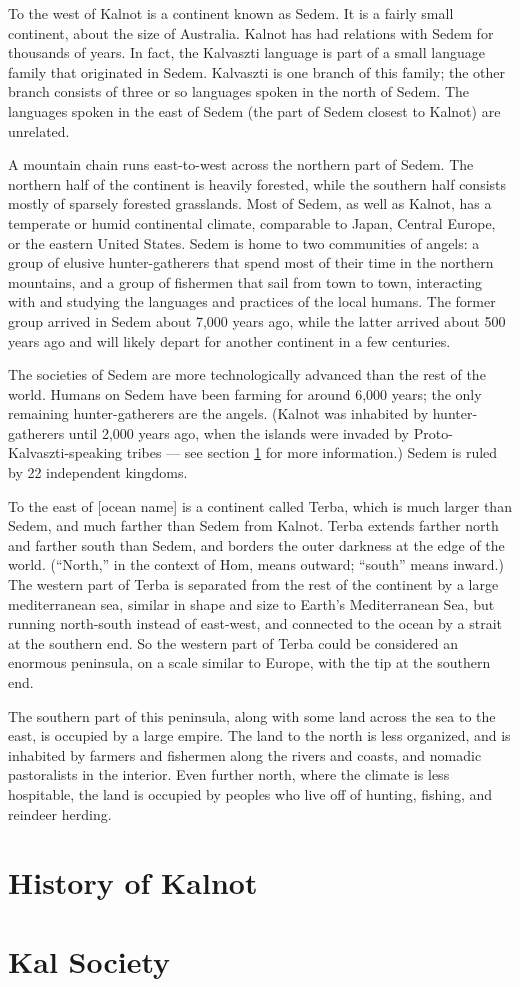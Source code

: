 \documentclass{article}
\begin{document}
To the west of Kalnot is a continent known as Sedem. It is a fairly small continent, about the size of Australia. Kalnot has had relations with Sedem for thousands of years. In fact, the Kalvaszti language is part of a small language family that originated in Sedem. Kalvaszti is one branch of this family; the other branch consists of three or so languages spoken in the north of Sedem. The languages spoken in the east of Sedem (the part of Sedem closest to Kalnot) are unrelated.

A mountain chain runs east-to-west across the northern part of Sedem. The northern half of the continent is heavily forested, while the southern half consists mostly of sparsely forested grasslands. Most of Sedem, as well as Kalnot, has a temperate or humid continental climate, comparable to Japan, Central Europe, or the eastern United States. Sedem is home to two communities of angels: a group of elusive hunter-gatherers that spend most of their time in the northern mountains, and a group of fishermen that sail from town to town, interacting with and studying the languages and practices of the local humans. The former group arrived in Sedem about 7,000 years ago, while the latter arrived about 500 years ago and will likely depart for another continent in a few centuries.

The societies of Sedem are more technologically advanced than the rest of the world. Humans on Sedem have been farming for around 6,000 years; the only remaining hunter-gatherers are the angels. (Kalnot was inhabited by hunter-gatherers until 2,000 years ago, when the islands were invaded by Proto-Kalvaszti-speaking tribes --- see section \ref{history} for more information.) Sedem is ruled by 22 independent kingdoms.

To the east of [ocean name] is a continent called Terba, which is much larger than Sedem, and much farther than Sedem from Kalnot. Terba extends farther north and farther south than Sedem, and borders the outer darkness at the edge of the world. (``North,'' in the context of Hom, means outward; ``south'' means inward.) The western part of Terba is separated from the rest of the continent by a large mediterranean sea, similar in shape and size to Earth's Mediterranean Sea, but running north-south instead of east-west, and connected to the ocean by a strait at the southern end. So the western part of Terba could be considered an enormous peninsula, on a scale similar to Europe, with the tip at the southern end.

The southern part of this peninsula, along with some land across the sea to the east, is occupied by a large empire. The land to the north is less organized, and is inhabited by farmers and fishermen along the rivers and coasts, and nomadic pastoralists in the interior. Even further north, where the climate is less hospitable, the land is occupied by peoples who live off of hunting, fishing, and reindeer herding.

\section{History of Kalnot}
\label{history}

\section{Kal Society}
\end{document}
